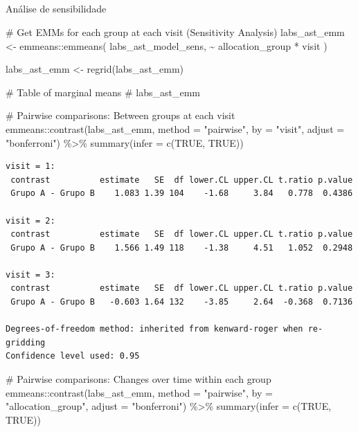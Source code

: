 \documentclass[
  12pt,
]{article}
\makeatletter
\let\oldsubparagraph\subparagraph
\renewcommand{\subparagraph}{
    \@ifstar
      \xxxSubParagraphStar
      \xxxSubParagraphNoStar
  }
\newcommand{\xxxSubParagraphStar}[1]{\oldsubparagraph*{#1}\mbox{}}
\newcommand{\xxxSubParagraphNoStar}[1]{\oldsubparagraph{#1}\mbox{}}
\newenvironment{Shaded}{\begin{snugshade}}{\end{snugshade}}
\newcommand{\AttributeTok}[1]{\textcolor[rgb]{0.40,0.45,0.13}{#1}}
\newcommand{\CommentTok}[1]{\textcolor[rgb]{0.37,0.37,0.37}{#1}}
\newcommand{\ConstantTok}[1]{\textcolor[rgb]{0.56,0.35,0.01}{#1}}
\newcommand{\FunctionTok}[1]{\textcolor[rgb]{0.28,0.35,0.67}{#1}}
\newcommand{\NormalTok}[1]{\textcolor[rgb]{0.00,0.23,0.31}{#1}}
\newcommand{\OtherTok}[1]{\textcolor[rgb]{0.00,0.23,0.31}{#1}}
\newcommand{\SpecialCharTok}[1]{\textcolor[rgb]{0.37,0.37,0.37}{#1}}
\newcommand{\StringTok}[1]{\textcolor[rgb]{0.13,0.47,0.30}{#1}}
\makeatother
\begin{document}
\subparagraph{Análise de
sensibilidade}\label{anuxe1lise-de-sensibilidade}

\begin{Shaded}
\begin{Highlighting}[]
\CommentTok{\# Get EMMs for each group at each visit (Sensitivity Analysis)}
\NormalTok{labs\_ast\_emm }\OtherTok{\textless{}{-}}\NormalTok{ emmeans}\SpecialCharTok{::}\FunctionTok{emmeans}\NormalTok{(}
\NormalTok{    labs\_ast\_model\_sens, }
    \SpecialCharTok{\textasciitilde{}}\NormalTok{ allocation\_group }\SpecialCharTok{*}\NormalTok{ visit}
\NormalTok{)}

\NormalTok{labs\_ast\_emm }\OtherTok{\textless{}{-}} \FunctionTok{regrid}\NormalTok{(labs\_ast\_emm)}

\CommentTok{\# Table of marginal means}
\CommentTok{\# labs\_ast\_emm}

\CommentTok{\# Pairwise comparisons: Between groups at each visit}
\NormalTok{emmeans}\SpecialCharTok{::}\FunctionTok{contrast}\NormalTok{(labs\_ast\_emm,}
\AttributeTok{method =} \StringTok{"pairwise"}\NormalTok{, }\AttributeTok{by =} \StringTok{"visit"}\NormalTok{,}
\AttributeTok{adjust =} \StringTok{"bonferroni"}\NormalTok{) }\SpecialCharTok{\%\textgreater{}\%} \FunctionTok{summary}\NormalTok{(}\AttributeTok{infer =} \FunctionTok{c}\NormalTok{(}\ConstantTok{TRUE}\NormalTok{, }\ConstantTok{TRUE}\NormalTok{))}
\end{Highlighting}
\end{Shaded}

\begin{verbatim}
visit = 1:
 contrast          estimate   SE  df lower.CL upper.CL t.ratio p.value
 Grupo A - Grupo B    1.083 1.39 104    -1.68     3.84   0.778  0.4386

visit = 2:
 contrast          estimate   SE  df lower.CL upper.CL t.ratio p.value
 Grupo A - Grupo B    1.566 1.49 118    -1.38     4.51   1.052  0.2948

visit = 3:
 contrast          estimate   SE  df lower.CL upper.CL t.ratio p.value
 Grupo A - Grupo B   -0.603 1.64 132    -3.85     2.64  -0.368  0.7136

Degrees-of-freedom method: inherited from kenward-roger when re-gridding 
Confidence level used: 0.95 
\end{verbatim}

\begin{Shaded}
\begin{Highlighting}[]
\CommentTok{\# Pairwise comparisons: Changes over time within each group}
\NormalTok{emmeans}\SpecialCharTok{::}\FunctionTok{contrast}\NormalTok{(labs\_ast\_emm,}
\AttributeTok{method =} \StringTok{"pairwise"}\NormalTok{, }\AttributeTok{by =} \StringTok{"allocation\_group"}\NormalTok{,}
\AttributeTok{adjust =} \StringTok{"bonferroni"}\NormalTok{) }\SpecialCharTok{\%\textgreater{}\%} \FunctionTok{summary}\NormalTok{(}\AttributeTok{infer =} \FunctionTok{c}\NormalTok{(}\ConstantTok{TRUE}\NormalTok{, }\ConstantTok{TRUE}\NormalTok{))}
\end{Highlighting}
\end{Shaded}
\end{document}
